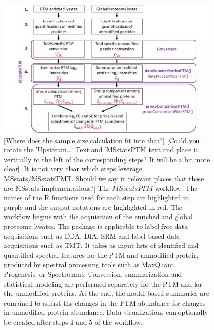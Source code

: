 \documentclass[mcp]{article}
\numberwithin{table}{section}
\def\todo#1{{\color{red}[#1]}}
\begin{document}
\begin{figure}[ht]
\centering
\includegraphics[scale=.5]{images/MSstatsPTM_design.png}
\caption{\todo{Where does the sample size calculation fit into that?} \todo{Could you rotate the 'Upstream...' Text and 'MSstatsPTM text and place it vertically to the left of the corresponding steps? It will be a bit more clear} \todo{It is not very clear which steps leverage MSstats/MSstatsTMT. Should we say in relevant places that these are MSstats implementations?} The $MSstatsPTM$ workflow. The names of the R functions used for each step are highlighted in purple and the output notations are highlighted in red. The workflow begins with the acquisition of the enriched and global proteome lysates. The package is applicable to label-free data acquisitions such as DDA, DIA, SRM and label-based data acquisitions such as TMT. It takes as input lists of identified and quantified spectral features for the PTM and unmodified protein, produced by spectral processing tools such as MaxQuant, Progenesis, or Spectronaut.  Conversion, summarization and statistical modeling are performed separately for the PTM and for the unmodified proteins. At the end, the model-based summaries are combined to adjust the changes in the PTM abundance for changes in unmodified protein abundance. Data visualizations can optionally be created after steps 4 and 5 of the workflow.}
\label{fig:msstatsptm_design}
\end{figure}
\end{document}
